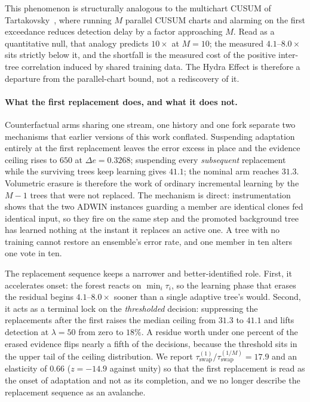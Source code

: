 \documentclass[10pt,conference]{IEEEtran}
\theoremstyle{definition}
\newcommand{\SixCanonDeltaE}{0.3268}         %
\newcommand{\SixCeilingFull}{31.3}           %
\newcommand{\SixCeilingNoSwap}{41.1}         %
\newcommand{\SixCeilingFrozen}{650}          %
\newcommand{\NoSwapLeak}{18}                 %
\newcommand{\SwapRatio}{17.9}                %
\newcommand{\SwapElasticity}{0.66}           %
\newcommand{\SwapElasticityZ}{-14.9}         %
\begin{document}
This phenomenon is structurally analogous to the multichart CUSUM of Tartakovsky~\cite{tartakovsky_2005_multichart}, where running $M$ parallel CUSUM charts and alarming on the first exceedance reduces detection delay by a factor approaching $M$. Read as a quantitative null, that analogy predicts $10\times$ at $M = 10$; the measured $4.1$--$8.0\times$ sits strictly below it, and the shortfall is the measured cost of the positive inter-tree correlation induced by shared training data. The Hydra Effect is therefore a departure from the parallel-chart bound, not a rediscovery of it.

\paragraph{What the first replacement does, and what it does not.}
Counterfactual arms sharing one stream, one history and one fork separate two mechanisms that earlier versions of this work conflated. Suspending adaptation entirely at the first replacement leaves the error excess in place and the evidence ceiling rises to $\SixCeilingFrozen$ at $\Delta e = \SixCanonDeltaE$; suspending every \emph{subsequent} replacement while the surviving trees keep learning gives $\SixCeilingNoSwap$; the nominal arm reaches $\SixCeilingFull$. Volumetric erasure is therefore the work of ordinary incremental learning by the $M-1$ trees that were not replaced. The mechanism is direct: instrumentation shows that the two ADWIN instances guarding a member are identical clones fed identical input, so they fire on the same step and the promoted background tree has learned nothing at the instant it replaces an active one. A tree with no training cannot restore an ensemble's error rate, and one member in ten alters one vote in ten.

The replacement sequence keeps a narrower and better-identified role. First, it accelerates onset: the forest reacts on $\min_i \tau_i$, so the learning phase that erases the residual begins $4.1$--$8.0\times$ sooner than a single adaptive tree's would. Second, it acts as a terminal lock on the \emph{thresholded} decision: suppressing the replacements after the first raises the median ceiling from $\SixCeilingFull$ to $\SixCeilingNoSwap$ and lifts detection at $\lambda = 50$ from zero to $\NoSwapLeak\%$. A residue worth under one percent of the erased evidence flips nearly a fifth of the decisions, because the threshold sits in the upper tail of the ceiling distribution. We report $\tau_{\mathrm{swap}}^{(1)}/\tau_{\mathrm{swap}}^{(1/M)} = \SwapRatio$ and an elasticity of $\SwapElasticity$ ($z = \SwapElasticityZ$ against unity) so that the first replacement is read as the onset of adaptation and not as its completion, and we no longer describe the replacement sequence as an avalanche.
\end{document}
